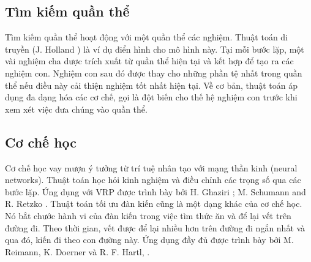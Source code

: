 \subsection{Tìm kiếm quần thể}

Tìm kiếm quần thể hoạt động với một quần thể các nghiệm. Thuật toán di truyền (J. Holland \cite{holland1975adaptation}) là ví dụ điển hình cho mô hình này. Tại mỗi bước lặp, một vài nghiệm cha dược trích xuất từ quần thể hiện tại và kết hợp để tạo ra các nghiệm con. Nghiệm con sau đó được thay cho những phần tệ nhất trong quần thể nếu điều này cải thiện nghiệm tốt nhất hiện tại. Về cơ bản, thuật toán áp dụng đa dạng hóa các cơ chế, gọi là đột biến cho thế hệ nghiệm con trước khi xem xét việc đưa chúng vào quần thể.


\subsection{Cơ chế học}

Cơ chế học vay mượn ý tưởng từ trí tuệ nhân tạo với mạng thần kinh (neural networks). Thuật toán học hỏi kinh nghiệm và điều chỉnh các trọng số qua các bước lặp. Ứng dụng với VRP được trình bày bởi H. Ghaziri \cite{ghaziri1991solving}; M. Schumann and R. Retzko \cite{schumann1995self}. Thuật toán tối ưu đàn kiến cũng là một dạng khác của cơ chế học. Nó bắt chước hành vi của đàn kiến trong việc tìm thức ăn và để lại vết trên đường đi. Theo thời gian, vết được để lại nhiều hơn trên đường đi ngắn nhất và qua đó, kiến đi theo con đường này. Ứng dụng đầy đủ được trình bày bởi M. Reimann, K. Doerner và R. F. Hartl,  \cite{reimann2004d}.


